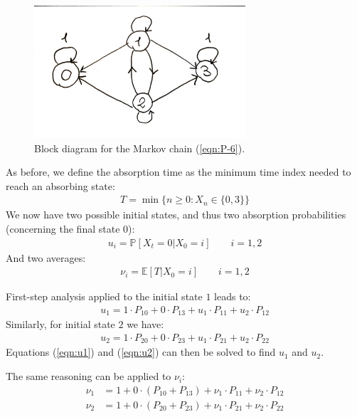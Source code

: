 \documentclass[../template.tex]{subfiles}
\begin{document}
\begin{figure}[htp]
    \centering
    \includegraphics[width=0.7\textwidth]{block6.jpeg}
    \caption{Block diagram for the Markov chain (\ref{eqn:P-6}).\label{fig:block6}} 
\end{figure}

As before, we define the absorption time as the minimum time index needed to reach an absorbing state:
\begin{align*}
    T = \min \{n \geq 0\colon X_n \in \{0,3\}\}
\end{align*}
We now have two possible initial states, and thus two absorption probabilities (concerning the final state $0$):
\begin{align*}
    u_i = \mathbb{P}[X_t = 0|X_0=i] \qquad i=1,2
\end{align*}
And two averages:
\begin{align*}
    \nu_i = \mathbb{E}[T|X_0=i] \qquad i=1,2
\end{align*}

First-step analysis applied to the initial state $1$ leads to:
\begin{align}\label{eqn:u1}
    u_1 = 1 \cdot P_{10} + 0 \cdot P_{13} + u_1 \cdot P_{11} + u_2 \cdot P_{12}
\end{align}
Similarly, for initial state $2$ we have:
\begin{align}\label{eqn:u2}
    u_2 = 1 \cdot P_{20} + 0 \cdot P_{23} + u_1 \cdot P_{21} + u_2 \cdot P_{22}
\end{align}
Equations (\ref{eqn:u1}) and (\ref{eqn:u2}) can then be solved to find $u_1$ and $u_2$.

\medskip

The same reasoning can be applied to $\nu_i$:
\begin{align*}
    \nu_1 &= 1 + 0 \cdot (P_{10} + P_{13}) + \nu_1 \cdot P_{11} + \nu_2 \cdot P_{12}\\
    \nu_2 &= 1 + 0 \cdot (P_{20} + P_{23}) + \nu_1 \cdot P_{21} + \nu_2 \cdot P_{22}
\end{align*}
\end{document}
